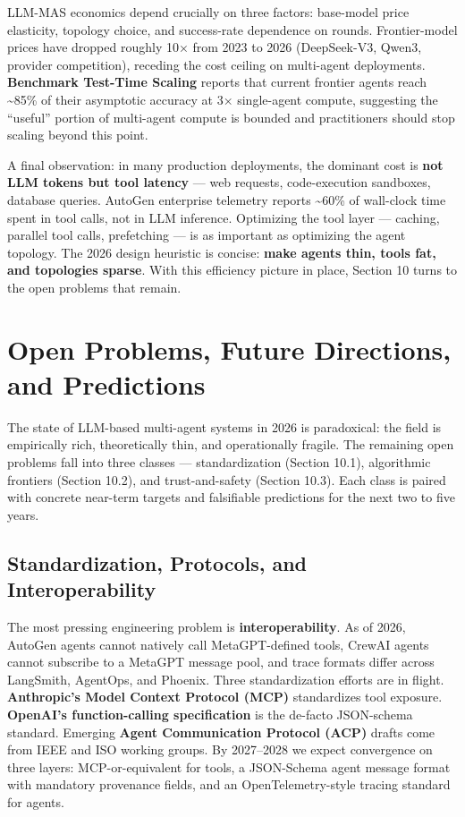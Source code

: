\documentclass{article}
\begin{document}
LLM-MAS economics depend crucially on three factors: base-model price elasticity, topology choice, and success-rate dependence on rounds. Frontier-model prices have dropped roughly 10× from 2023 to 2026 (DeepSeek-V3, Qwen3, provider competition), receding the cost ceiling on multi-agent deployments. \textbf{Benchmark Test-Time Scaling} \citep{li20262026} reports that current frontier agents reach \textasciitilde85\% of their asymptotic accuracy at 3× single-agent compute, suggesting the ``useful'' portion of multi-agent compute is bounded and practitioners should stop scaling beyond this point.

A final observation: in many production deployments, the dominant cost is \textbf{not LLM tokens but tool latency} --- web requests, code-execution sandboxes, database queries. AutoGen enterprise telemetry \citep{shu2024towardseffectivege} reports \textasciitilde60\% of wall-clock time spent in tool calls, not in LLM inference. Optimizing the tool layer --- caching, parallel tool calls, prefetching --- is as important as optimizing the agent topology. The 2026 design heuristic is concise: \textbf{make agents thin, tools fat, and topologies sparse}. With this efficiency picture in place, Section 10 turns to the open problems that remain.

\section{Open Problems, Future Directions, and Predictions}\label{open-problems-future-directions-and-predictions}

The state of LLM-based multi-agent systems in 2026 is paradoxical: the field is empirically rich, theoretically thin, and operationally fragile. The remaining open problems fall into three classes --- standardization (Section 10.1), algorithmic frontiers (Section 10.2), and trust-and-safety (Section 10.3). Each class is paired with concrete near-term targets and falsifiable predictions for the next two to five years.

\subsection{Standardization, Protocols, and Interoperability}\label{standardization-protocols-and-interoperability}

The most pressing engineering problem is \textbf{interoperability}. As of 2026, AutoGen agents cannot natively call MetaGPT-defined tools, CrewAI agents cannot subscribe to a MetaGPT message pool, and trace formats differ across LangSmith, AgentOps, and Phoenix. Three standardization efforts are in flight. \textbf{Anthropic's Model Context Protocol (MCP)} standardizes tool exposure. \textbf{OpenAI's function-calling specification} is the de-facto JSON-schema standard. Emerging \textbf{Agent Communication Protocol (ACP)} drafts come from IEEE and ISO working groups. By 2027--2028 we expect convergence on three layers: MCP-or-equivalent for tools, a JSON-Schema agent message format with mandatory provenance fields, and an OpenTelemetry-style tracing standard for agents.
\end{document}
